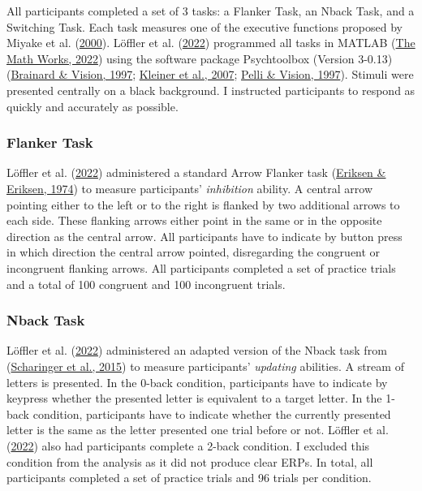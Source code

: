 \documentclass[
  man]{apa7}
\begin{document}
All participants completed a set of 3 tasks: a Flanker Task, an Nback Task, and a Switching Task. Each task measures one of the executive functions proposed by Miyake et al. (\protect\hyperlink{ref-miyake2000unity}{2000}). Löffler et al. (\protect\hyperlink{ref-loffler2022common}{2022}) programmed all tasks in MATLAB (\protect\hyperlink{ref-matlab2022b}{The Math Works, 2022}) using the software package Psychtoolbox (Version 3-0.13) (\protect\hyperlink{ref-brainard1997psychophysics}{Brainard \& Vision, 1997}; \protect\hyperlink{ref-kleiner2007psychtoolbox}{Kleiner et al., 2007}; \protect\hyperlink{ref-pelli1997videotoolbox}{Pelli \& Vision, 1997}). Stimuli were presented centrally on a black background. I instructed participants to respond as quickly and accurately as possible.

\hypertarget{flanker-task}{%
\subsubsection{Flanker Task}\label{flanker-task}}

Löffler et al. (\protect\hyperlink{ref-loffler2022common}{2022}) administered a standard Arrow Flanker task (\protect\hyperlink{ref-eriksen1974effects}{Eriksen \& Eriksen, 1974}) to measure participants' \emph{inhibition} ability. A central arrow pointing either to the left or to the right is flanked by two additional arrows to each side. These flanking arrows either point in the same or in the opposite direction as the central arrow. All participants have to indicate by button press in which direction the central arrow pointed, disregarding the congruent or incongruent flanking arrows. All participants completed a set of practice trials and a total of 100 congruent and 100 incongruent trials.

\hypertarget{nback-task}{%
\subsubsection{Nback Task}\label{nback-task}}

Löffler et al. (\protect\hyperlink{ref-loffler2022common}{2022}) administered an adapted version of the Nback task from (\protect\hyperlink{ref-scharinger2015flanker}{Scharinger et al., 2015}) to measure participants' \emph{updating} abilities. A stream of letters is presented. In the 0-back condition, participants have to indicate by keypress whether the presented letter is equivalent to a target letter. In the 1-back condition, participants have to indicate whether the currently presented letter is the same as the letter presented one trial before or not. Löffler et al. (\protect\hyperlink{ref-loffler2022common}{2022}) also had participants complete a 2-back condition. I excluded this condition from the analysis as it did not produce clear ERPs. In total, all participants completed a set of practice trials and 96 trials per condition.
\end{document}
